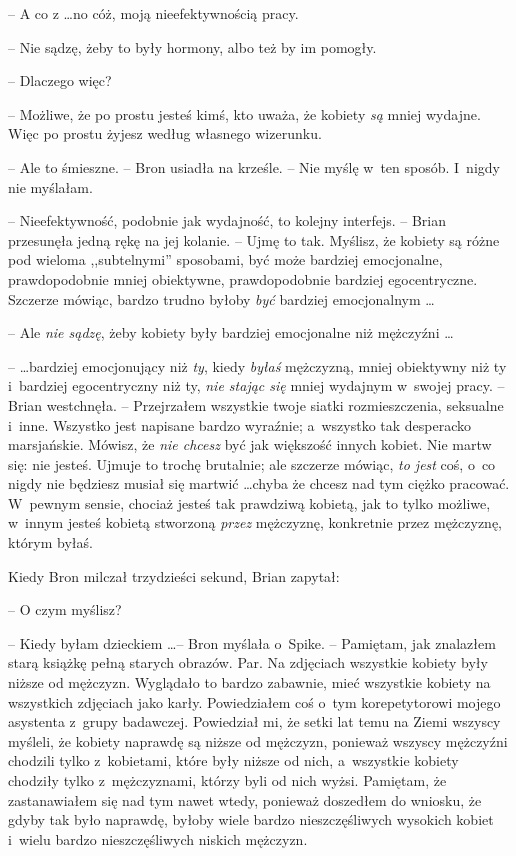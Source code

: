 \documentclass[oneside,polish,11pt,rmheadings]{mwbk}
\begin{document}
-- A co z \ldots  no cóż, moją nieefektywnością pracy. 

-- Nie sądzę, żeby to były hormony, albo też by im pomogły. 

-- Dlaczego więc? 

-- Możliwe, że po prostu jesteś kimś, kto uważa, że kobiety \textit{są }mniej wydajne. Więc po prostu żyjesz według własnego wizerunku. 

-- Ale to śmieszne. -- Bron usiadła na krześle. -- Nie myślę w~ten sposób. I~nigdy nie myślałam. 

-- Nieefektywność, podobnie jak wydajność, to kolejny interfejs. --  Brian przesunęła jedną rękę na jej kolanie. -- Ujmę to tak. Myślisz, że kobiety są różne pod wieloma ,,subtelnymi'' sposobami, być może bardziej emocjonalne, prawdopodobnie mniej obiektywne, prawdopodobnie bardziej egocentryczne. Szczerze mówiąc, bardzo trudno byłoby \textit{być }bardziej emocjonalnym \ldots  

-- Ale \textit{nie sądzę}, żeby kobiety były bardziej emocjonalne niż mężczyźni \ldots  

--  \ldots bardziej emocjonujący niż \textit{ty}, kiedy \textit{byłaś }mężczyzną, mniej obiektywny niż ty i~bardziej egocentryczny niż ty, \textit{nie stając się }mniej wydajnym w~swojej pracy. --  Brian westchnęła. -- Przejrzałem wszystkie twoje siatki rozmieszczenia, seksualne i~inne. Wszystko jest napisane bardzo wyraźnie; a~wszystko tak desperacko marsjańskie. Mówisz, że \textit{nie chcesz }być jak większość innych kobiet. Nie martw się: nie jesteś. Ujmuje to trochę brutalnie; ale szczerze mówiąc, \textit{to jest }coś, o~co nigdy nie będziesz musiał się martwić \ldots  chyba że chcesz nad tym ciężko pracować. W~pewnym sensie, chociaż jesteś tak prawdziwą kobietą, jak to tylko możliwe, w~innym jesteś kobietą stworzoną \textit{przez }mężczyznę, konkretnie przez mężczyznę, którym byłaś. 

Kiedy Bron milczał trzydzieści sekund, Brian zapytał: 

-- O czym myślisz? 

-- Kiedy byłam dzieckiem \ldots   -- Bron myślała o~Spike. -- Pamiętam, jak znalazłem starą książkę pełną starych obrazów. Par.  Na zdjęciach wszystkie kobiety były niższe od mężczyzn. Wyglądało to bardzo zabawnie, mieć wszystkie kobiety na wszystkich zdjęciach jako karły. Powiedziałem coś o~tym korepetytorowi mojego asystenta z~grupy badawczej. Powiedział mi, że setki lat temu na Ziemi wszyscy myśleli, że kobiety naprawdę są niższe od mężczyzn, ponieważ wszyscy mężczyźni chodzili tylko z~kobietami, które były niższe od nich, a~wszystkie kobiety chodziły tylko z~mężczyznami, którzy byli od nich wyżsi. Pamiętam, że zastanawiałem się nad tym nawet wtedy, ponieważ doszedłem do wniosku, że gdyby tak było naprawdę, byłoby wiele bardzo nieszczęśliwych wysokich kobiet i~wielu bardzo nieszczęśliwych niskich mężczyzn. 
\end{document}
